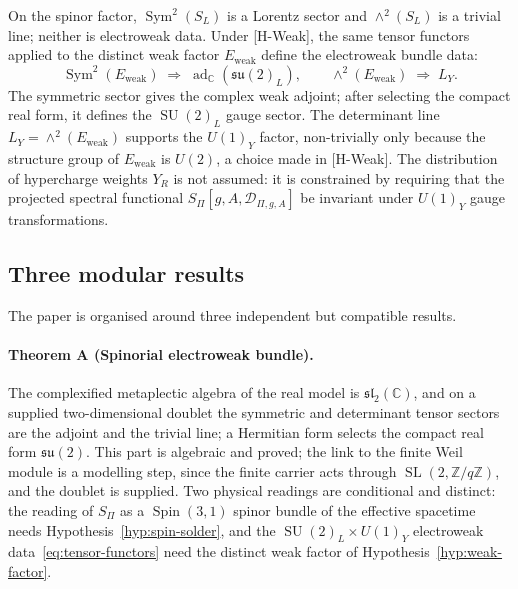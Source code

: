 \documentclass[11pt,a4paper]{article}
\theoremstyle{definition}
\theoremstyle{remark}
\newcommand{\Spin}{\operatorname{Spin}}
\newcommand{\SL}{\operatorname{SL}}
\newcommand{\SU}{\operatorname{SU}}
\begin{document}
      On the spinor factor, $\operatorname{Sym}^2(S_L)$ is a Lorentz sector and $\wedge^2(S_L)$ is a
      trivial line; neither is electroweak data.
      Under [H-Weak], the same tensor functors applied to the distinct weak factor
      $E_{\mathrm{weak}}$ define the electroweak bundle data:
      \begin{equation}
        \label{eq:tensor-functors}
        \operatorname{Sym}^2(E_{\mathrm{weak}}) \;\Rightarrow\; \operatorname{ad}_{\mathbb{C}}(\mathfrak{su}(2)_L),
        \qquad
        \wedge^2(E_{\mathrm{weak}}) \;\Rightarrow\; L_Y .
      \end{equation}
      The symmetric sector gives the complex weak adjoint; after selecting the compact real
      form, it defines the $\SU(2)_L$ gauge sector.
      The determinant line $L_Y = \wedge^2(E_{\mathrm{weak}})$ supports the $U(1)_Y$ factor, non-trivially
      only because the structure group of $E_{\mathrm{weak}}$ is $U(2)$, a choice made in [H-Weak].
      The distribution of hypercharge weights $Y_R$ is not assumed: it is constrained
      by requiring that the projected spectral functional
      $S_\Pi[g, A, \mathcal{D}_{\Pi,g,A}]$ be invariant under $U(1)_Y$ gauge
      transformations.

    \subsection{Three modular results}
      \label{ssec:results}

      The paper is organised around three independent but compatible results.

      \paragraph{Theorem A (Spinorial electroweak bundle).}
        The complexified metaplectic algebra of the real model is $\mathfrak{sl}_2(\mathbb{C})$, and on a
        supplied two-dimensional doublet the symmetric and determinant tensor sectors are the adjoint and
        the trivial line; a Hermitian form selects the compact real form $\mathfrak{su}(2)$.
        This part is algebraic and proved; the link to the finite Weil module is a modelling step, since
        the finite carrier acts through $\SL(2,\mathbb{Z}/q\mathbb{Z})$, and the doublet is supplied.
        Two physical readings are conditional and distinct: the reading of $S_\Pi$ as a $\Spin(3,1)$
        spinor bundle of the effective spacetime needs Hypothesis~\ref{hyp:spin-solder}, and the
        $\SU(2)_L \times U(1)_Y$ electroweak data~\eqref{eq:tensor-functors} need the distinct weak factor of
        Hypothesis~\ref{hyp:weak-factor}.
\end{document}
